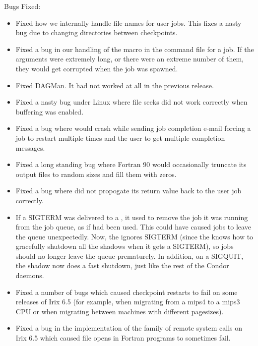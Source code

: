 \noindent Bugs Fixed:

\begin{itemize}

\item Fixed how we internally handle file names for user jobs. This
fixes a nasty bug due to changing directories between checkpoints.

\item Fixed a bug in our handling of the  macro in
the command file for a job. If the arguments were extremely long, or
there were an extreme number of them, they would get corrupted when the
job was spawned.

\item Fixed DAGMan. It had not worked at all in the previous release.

\item Fixed a nasty bug under Linux where file seeks did not work
correctly when buffering was enabled.

\item Fixed a bug where  would crash while sending job
completion e-mail forcing a job to restart multiple times and the user
to get multiple completion messages.

\item Fixed a long standing bug where Fortran 90 would occasionally
truncate its output files to random sizes and fill them with zeros.

\item Fixed a bug where  did not propogate its return
value back to the user job correctly.

\item If a SIGTERM was delivered to a , it used to
remove the job it was running from the job queue, as if 
had been used.
This could have caused jobs to leave the queue unexpectedly.
Now, the  ignores SIGTERM (since the 
knows how to gracefully shutdown all the shadows when it gets a
SIGTERM), so jobs should no longer leave the queue prematurely.
In addition, on a SIGQUIT, the shadow now does a fast shutdown, just
like the rest of the Condor daemons.

\item Fixed a number of bugs which caused checkpoint restarts
to fail on some releases of Irix 6.5 (for example, when migrating from
a mips4 to a mips3 CPU or when migrating between machines with
different pagesizes).

\item Fixed a bug in the implementation of the  family
of remote system calls on Irix 6.5 which caused file opens in Fortran
programs to sometimes fail.


\end{itemize}
